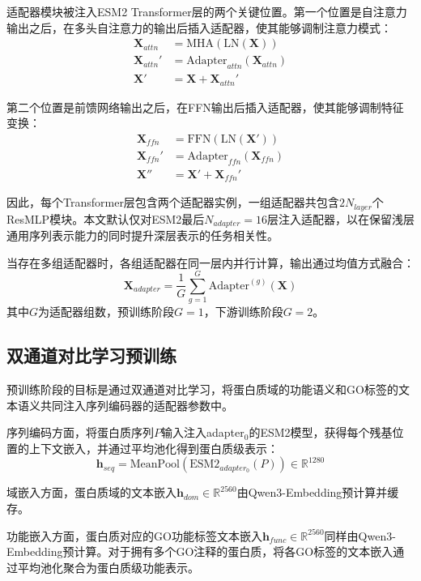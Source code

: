 适配器模块被注入ESM2 Transformer层的两个关键位置。第一个位置是自注意力输出之后，在多头自注意力的输出后插入适配器，使其能够调制注意力模式：
\begin{align}
    \mathbf{X}_{attn} &= \text{MHA}(\text{LN}(\mathbf{X})) \\
    \mathbf{X}_{attn}' &= \text{Adapter}_{attn}(\mathbf{X}_{attn}) \\
    \mathbf{X}' &= \mathbf{X} + \mathbf{X}_{attn}'
\end{align}

第二个位置是前馈网络输出之后，在FFN输出后插入适配器，使其能够调制特征变换：
\begin{align}
    \mathbf{X}_{ffn} &= \text{FFN}(\text{LN}(\mathbf{X}')) \\
    \mathbf{X}_{ffn}' &= \text{Adapter}_{ffn}(\mathbf{X}_{ffn}) \\
    \mathbf{X}'' &= \mathbf{X}' + \mathbf{X}_{ffn}'
\end{align}

因此，每个Transformer层包含两个适配器实例，一组适配器共包含$2N_{layer}$个ResMLP模块。本文默认仅对ESM2最后$N_{adapter}=16$层注入适配器，以在保留浅层通用序列表示能力的同时提升深层表示的任务相关性。

当存在多组适配器时，各组适配器在同一层内并行计算，输出通过均值方式融合：
\begin{equation}
    \mathbf{X}_{adapter} = \frac{1}{G}\sum_{g=1}^{G}\text{Adapter}^{(g)}(\mathbf{X})
\end{equation}
其中$G$为适配器组数，预训练阶段$G=1$，下游训练阶段$G=2$。

\subsection{双通道对比学习预训练}

预训练阶段的目标是通过双通道对比学习，将蛋白质域的功能语义和GO标签的文本语义共同注入序列编码器的适配器参数中。

序列编码方面，将蛋白质序列$P$输入注入adapter$_0$的ESM2模型，获得每个残基位置的上下文嵌入，并通过平均池化得到蛋白质级表示：
\begin{equation}
    \mathbf{h}_{seq} = \text{MeanPool}(\text{ESM2}_{adapter_0}(P)) \in \mathbb{R}^{1280}
\end{equation}

域嵌入方面，蛋白质域的文本嵌入$\mathbf{h}_{dom} \in \mathbb{R}^{2560}$由Qwen3-Embedding预计算并缓存。

功能嵌入方面，蛋白质对应的GO功能标签文本嵌入$\mathbf{h}_{func} \in \mathbb{R}^{2560}$同样由Qwen3-Embedding预计算。对于拥有多个GO注释的蛋白质，将各GO标签的文本嵌入通过平均池化聚合为蛋白质级功能表示。

